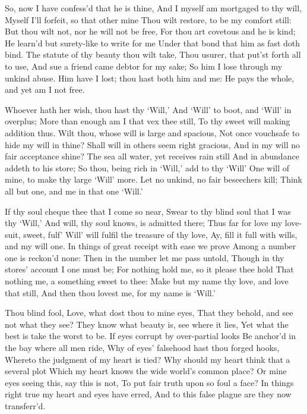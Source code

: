 \documentclass[twocolumn]{book}
\begin{document}
So, now I have confess'd that he is thine,
And I myself am mortgaged to thy will,
Myself I'll forfeit, so that other mine
Thou wilt restore, to be my comfort still:
But thou wilt not, nor he will not be free,
For thou art covetous and he is kind;
He learn'd but surety-like to write for me
Under that bond that him as fast doth bind.
The statute of thy beauty thou wilt take,
Thou usurer, that put'st forth all to use,
And sue a friend came debtor for my sake;
So him I lose through my unkind abuse.
  Him have I lost; thou hast both him and me:
  He pays the whole, and yet am I not free.


Whoever hath her wish, thou hast thy `Will,'
And `Will' to boot, and `Will' in overplus;
More than enough am I that vex thee still,
To thy sweet will making addition thus.
\numerus*{}Wilt thou, whose will is large and spacious,
Not once vouchsafe to hide my will in thine?
Shall will in others seem right gracious,
And in my will no fair acceptance shine?
The sea all water, yet receives rain still
And in abundance addeth to his store;
So thou, being rich in `Will,' add to thy `Will'
One will of mine, to make thy large `Will' more.
  Let no unkind, no fair beseechers kill;
  Think all but one, and me in that one `Will.'


If thy soul cheque thee that I come so near,
Swear to thy blind soul that I was thy `Will,'
And will, thy soul knows, is admitted there;
Thus far for love my love-suit, sweet, fulf'
Will' will fulfil the treasure of thy love,
Ay, fill it full with wills, and my will one.
In things of great receipt with ease we prove
Among a number one is reckon'd none:
Then in the number let me pass untold,
Though in thy stores' account I one must be;
For nothing hold me, so it please thee hold
That nothing me, a something sweet to thee:
  Make but my name thy love, and love that still,
  And then thou lovest me, for my name is `Will.'


Thou blind fool, Love, what dost thou to mine eyes,
That they behold, and see not what they see?
They know what beauty is, see where it lies,
Yet what the best is take the worst to be.
If eyes corrupt by over-partial looks
Be anchor'd in the bay where all men ride,
Why of eyes' falsehood hast thou forged hooks,
Whereto the judgment of my heart is tied?
Why should my heart think that a several plot
Which my heart knows the wide world's common place?
Or mine eyes seeing this, say this is not,
To put fair truth upon so foul a face?
  In things right true my heart and eyes have erred,
  And to this false plague are they now transferr'd.
\end{document}
